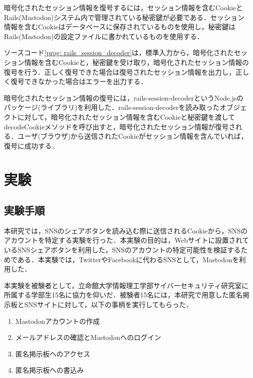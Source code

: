 \documentclass[10pt, a4paper]{jreport}
\begin{document}
暗号化されたセッション情報を復号するには，セッション情報を含むCookieとRails(Mastodon)システム内で管理されている秘密鍵が必要である．セッション情報を含むCookieはデータベースに保存されているものを使用し，秘密鍵はRails(Mastodon)の設定ファイルに書かれているものを使用する．

ソースコード\ref{prog: rails_session_decoder}は，標準入力から，暗号化されたセッション情報を含むCookieと，秘密鍵を受け取り，暗号化されたセッション情報の復号を行う．正しく復号できた場合は復号されたセッション情報を出力し，正しく復号できなかった場合はエラーを出力する．

暗号化されたセッション情報の復号には，rails-session-decoderというNode.jsのパッケージ(ライブラリ)を利用した\cite{npm_rails_session_decoder}．rails-session-decoderを読み取ったオブジェクトに対して，暗号化されたセッション情報を含むCookieと秘密鍵を渡してdecodeCookieメソッドを呼び出すと，暗号化されたセッション情報が復号される．ユーザ(ブラウザ)から送信されたCookieがセッション情報を含んでいれば，復号に成功する．

\newpage






\chapter{実験}
\section{実験手順}
本研究では，SNSのシェアボタンを読み込む際に送信されるCookieから，SNSのアカウントを特定する実験を行った．本実験の目的は，Webサイトに設置されているSNSシェアボタンを利用した，SNSのアカウントの特定可能性を検証するためである．本実験では，TwitterやFacebookに代わるSNSとして，Mastodonを利用した．

本実験を被験者として，立命館大学情報理工学部サイバーセキュリティ研究室に所属する学部生15名に協力を仰いだ．被験者15名には，本研究で用意した匿名掲示板とSNSサイトに対して，以下の事柄を実行してもらった．

\begin{enumerate}
\item{Mastodonアカウントの作成}
\item{メールアドレスの確認とMastodonへのログイン}
\item{匿名掲示板へのアクセス}
\item{匿名掲示板への書込み}
\end{enumerate}
\end{document}
